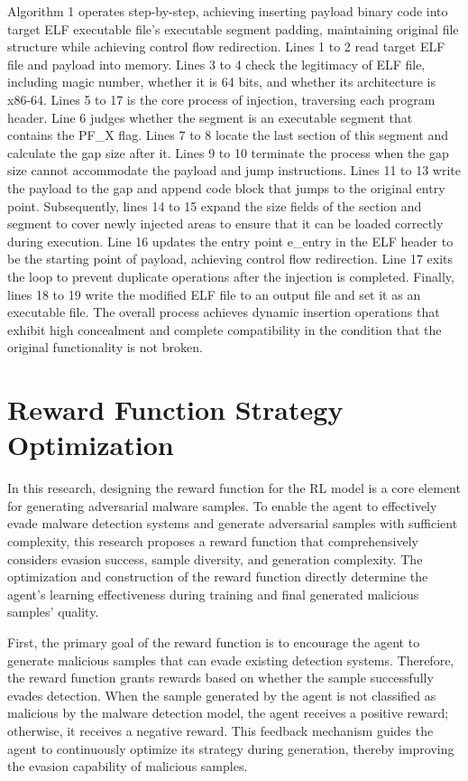 Algorithm 1 operates step-by-step, achieving inserting payload binary code into target ELF executable file's executable segment padding, maintaining original file structure while achieving control flow redirection. Lines 1 to 2 read target ELF file and payload into memory. Lines 3 to 4 check the legitimacy of ELF file, including magic number, whether it is 64 bits, and whether its architecture is x86-64. Lines 5 to 17 is the core process of injection, traversing each program header. Line 6 judges whether the segment is an executable segment that contains the PF\_X flag. Lines 7 to 8 locate the last section of this segment and calculate the gap size after it. Lines 9 to 10 terminate the process when the gap size cannot accommodate the payload and jump instructions. Lines 11 to 13 write the payload to the gap and append code block that jumps to the original entry point. Subsequently, lines 14 to 15 expand the size fields of the section and segment to cover newly injected areas to ensure that it can be loaded correctly during execution. Line 16 updates the entry point e\_entry in the ELF header to be the starting point of payload, achieving control flow redirection. Line 17 exits the loop to prevent duplicate operations after the injection is completed. Finally, lines 18 to 19 write the modified ELF file to an output file and set it as an executable file. The overall process achieves dynamic insertion operations that exhibit high concealment and complete compatibility in the condition that the original functionality is not broken.

\section{Reward Function Strategy Optimization}

In this research, designing the reward function for the RL model is a core element for generating adversarial malware samples. To enable the agent to effectively evade malware detection systems and generate adversarial samples with sufficient complexity, this research proposes a reward function that comprehensively considers evasion success, sample diversity, and generation complexity. The optimization and construction of the reward function directly determine the agent's learning effectiveness during training and final generated malicious samples' quality.

First, the primary goal of the reward function is to encourage the agent to generate malicious samples that can evade existing detection systems. Therefore, the reward function grants rewards based on whether the sample successfully evades detection. When the sample generated by the agent is not classified as malicious by the malware detection model, the agent receives a positive reward; otherwise, it receives a negative reward. This feedback mechanism guides the agent to continuously optimize its strategy during generation, thereby improving the evasion capability of malicious samples.

